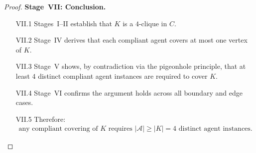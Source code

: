 \documentclass[12pt]{article}
\theoremstyle{definition}
\begin{document}
\begin{proof}
\medskip
\noindent\textbf{Stage~VII: Conclusion.}
\begin{enumerate}
    \item[VII.1] Stages~I--II establish that $K$ is a $4$-clique in $C$.
    \item[VII.2] Stage~IV derives that each compliant agent covers at
                 most one vertex of $K$.
    \item[VII.3] Stage~V shows, by contradiction via the pigeonhole
                 principle, that at least $4$ distinct compliant agent
                 instances are required to cover $K$.
    \item[VII.4] Stage~VI confirms the argument holds across all
                 boundary and edge cases.
    \item[VII.5] Therefore:
                 \begin{align}
                     \label{eq:lower-bound}
                     \text{any compliant covering of } K
                     \text{ requires }
                     |\mathcal{A}| \geq |K| = 4
                     \text{ distinct agent instances.}
                 \end{align}
\end{enumerate}
\end{proof}
\end{document}
